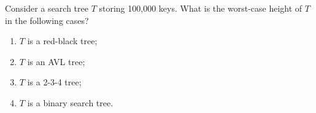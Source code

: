 Consider a search tree $T$ storing 100,000 keys. What is the
worst-case height of $T$ in the following cases?
\begin{enumerate}
\item  $T$ is a red-black tree;
\item  $T$ is an AVL tree;
\item  $T$ is a 2-3-4 tree;
\item  $T$ is a binary search tree.
\end{enumerate}
